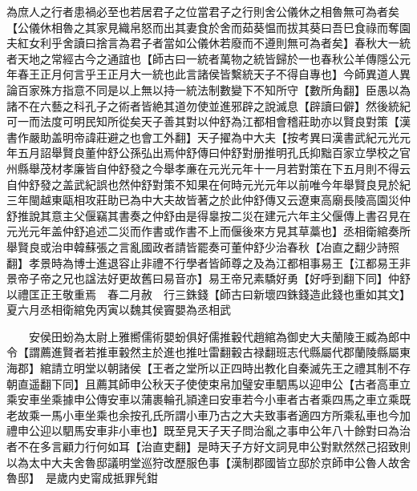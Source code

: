 為庶人之行者患禍必至也若居君子之位當君子之行則舍公儀休之相魯無可為者矣【公儀休相魯之其家見織帛怒而出其妻食於舍而茹葵愠而拔其葵曰吾巳食祿而奪園夫紅女利乎舍讀曰捨言為君子者當如公儀休若廢而不遵則無可為者矣】春秋大一統者天地之常經古今之通誼也【師古曰一統者萬物之統皆歸於一也春秋公羊傳隱公元年春王正月何言乎王正月大一統也此言諸侯皆繫統天子不得自專也】今師異道人異論百家殊方指意不同是以上無以持一統法制數變下不知所守【數所角翻】臣愚以為諸不在六藝之科孔子之術者皆絶其道勿使並進邪辟之說滅息【辟讀曰僻】然後統紀可一而法度可明民知所從矣天子善其對以仲舒為江都相會稽莊助亦以賢良對策【漢書作嚴助盖明帝諱莊避之也會工外翻】天子擢為中大夫【按考異曰漢書武紀元光元年五月詔舉賢良董仲舒公孫弘出焉仲舒傳曰仲舒對册推明孔氏抑黜百家立學校之官州縣舉茂材孝廉皆自仲舒發之今舉孝亷在元光元年十一月若對策在下五月則不得云自仲舒發之盖武紀誤也然仲舒對策不知果在何時元光元年以前唯今年舉賢良見於紀三年閩越東甌相攻莊助已為中大夫故皆著之於此仲舒傳又云遼東高廟長陵高園災仲舒推說其意主父偃竊其書奏之仲舒由是得辠按二災在建元六年主父偃傳上書召見在元光元年盖仲舒追述二災而作書或作書不上而偃後來方見其草藁也】丞相衛綰奏所舉賢良或治申韓蘇張之言亂國政者請皆罷奏可董仲舒少治春秋【冶直之翻少詩照翻】孝景時為博士進退容止非禮不行學者皆師尊之及為江都相事易王【江都易王非景帝子帝之兄也諡法好更故舊曰易音亦】易王帝兄素驕好勇【好呼到翻下同】仲舒以禮匡正王敬重焉　春二月赦　行三銖錢【師古曰新壞四銖錢造此錢也重如其文】夏六月丞相衛綰免丙寅以魏其侯竇嬰為丞相武

　　安侯田蚡為太尉上雅嚮儒術嬰蚡俱好儒推轂代趙綰為御史大夫蘭陵王臧為郎中令【謂薦進賢者若推車轂然主於進也推吐雷翻轂古禄翻班志代縣屬代郡蘭陵縣屬東海郡】綰請立明堂以朝諸侯【王者之堂所以正四時出教化自秦滅先王之禮其制不存朝直遥翻下同】且薦其師申公秋天子使使束帛加璧安車駟馬以迎申公【古者高車立乘安車坐乘據申公傳安車以蒲裹輪孔頴達曰安車若今小車者古者乘四馬之車立乘既老故乘一馬小車坐乘也余按孔氏所謂小車乃古之大夫致事者適四方所乘私車也今加禮申公迎以駟馬安車非小車也】既至見天子天子問治亂之事申公年八十餘對曰為治者不在多言顧力行何如耳【治直吏翻】是時天子方好文詞見申公對默然然己招致則以為太中大夫舍魯邸議明堂巡狩改歷服色事【漢制郡國皆立邸於京師申公魯人故舍魯邸】　是歲内史甯成抵罪髠鉗

